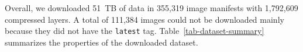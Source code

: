 
%
Overall, we downloaded 51~TB of data in 355,319 image manifests with 1,792,609
compressed layers. A total of 111,384 images could not be downloaded mainly
because they did not have the \texttt{latest} tag.
%
%
Table~\ref{tab-dataset-summary} summarizes the properties of the downloaded
dataset.
